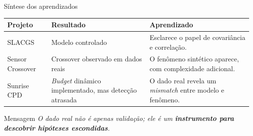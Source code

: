 \documentclass[aspectratio=169, 11pt]{beamer}
\begin{document}
\begin{frame}{Síntese dos aprendizados}

\begin{center}
\small
\begin{tabular}{@{}lp{3.6cm}p{5.2cm}@{}}
  \toprule
  \textbf{Projeto} & \textbf{Resultado} & \textbf{Aprendizado} \\
  \midrule
  SLACGS &
    Modelo controlado &
    Esclarece o papel de covariância e correlação. \\
  \addlinespace[2pt]
  Sensor Crossover &
    Crossover observado em dados reais &
    O fenômeno sintético aparece, com complexidade adicional. \\
  \addlinespace[2pt]
  Sunrise CPD &
    \textit{Budget} dinâmico implementado, mas detecção atrasada &
    O dado real revela um \emph{mismatch} entre modelo e fenômeno. \\
  \bottomrule
\end{tabular}
\end{center}

\vspace{0.8em}
\begin{block}{Mensagem}
\centering\itshape
O dado real não é apenas validação; ele é um \textbf{instrumento
para descobrir hipóteses escondidas}.
\end{block}

\end{frame}
\end{document}
